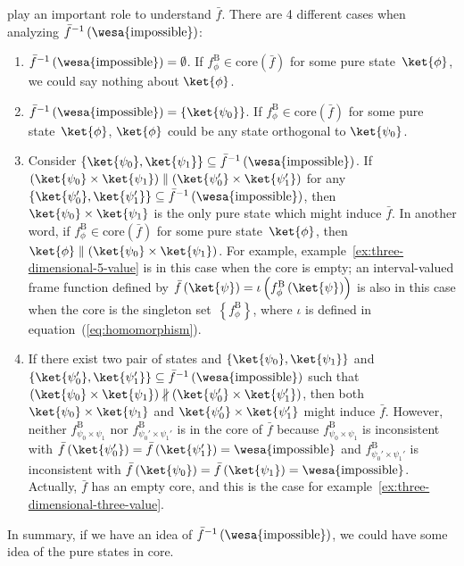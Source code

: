 \documentclass[12pt]{iopart}
\theoremstyle{plain}
\theoremstyle{definition}
\theoremstyle{remark}
\newcommand{\imposs}{{\mbox{\wesa{impossible}}}}
\begin{document}
play an important role to understand $\bar{f}$. There are 4 different
cases when analyzing $\bar{f}^{-1}\left(\imposs\right)$:
\begin{enumerate}
\item $\bar{f}^{-1}\left(\imposs\right)=\emptyset$. If $f_{\phi}^{\mathrm{B}}\in\mathrm{core}\left(\bar{f}\right)$
for some pure state~$\ket{\phi}$, we could say nothing about $\ket{\phi}$.
\item $\bar{f}^{-1}\left(\imposs\right)=\left\{ \ket{\psi_{0}}\right\} $.
If $f_{\phi}^{\mathrm{B}}\in\mathrm{core}\left(\bar{f}\right)$ for some pure
state~$\ket{\phi}$, $\ket{\phi}$ could be any state orthogonal
to $\ket{\psi_{0}}$.
\item Consider $\left\{ \ket{\psi_{0}},\ket{\psi_{1}}\right\} \subseteq\bar{f}^{-1}\left(\imposs\right)$.
If $\left(\ket{\psi_{0}}\times\ket{\psi_{1}}\right)\parallel\left(\ket{\psi_{0}'}\times\ket{\psi_{1}'}\right)$
for any $\left\{ \ket{\psi_{0}'},\ket{\psi_{1}'}\right\} \subseteq\bar{f}^{-1}\left(\imposs\right)$,
then $\ket{\psi_{0}}\times\ket{\psi_{1}}$ is the only pure state
which might induce $\bar{f}$. In another word, if $f_{\phi}^{\mathrm{B}}\in\mathrm{core}\left(\bar{f}\right)$
for some pure state~$\ket{\phi}$, then $\ket{\phi}\parallel\left(\ket{\psi_{0}}\times\ket{\psi_{1}}\right)$.
For example, example~\ref{ex:three-dimensional-5-value} is in this
case when the core is empty; an interval-valued frame function defined
by $\bar{f}\left(\ket{\psi}\right)=\iota\left(f_{\phi}^{\mathrm{B}}\left(\ket{\psi}\right)\right)$
is also in this case when the core is the singleton set~$\left\{ f_{\phi}^{\mathrm{B}}\right\} $,
where $\iota$ is defined in equation~(\ref{eq:homomorphism}). 
\item If there exist two pair of states and $\left\{ \ket{\psi_{0}},\ket{\psi_{1}}\right\} $
and $\left\{ \ket{\psi_{0}'},\ket{\psi_{1}'}\right\} \subseteq\bar{f}^{-1}\left(\imposs\right)$
such that $\left(\ket{\psi_{0}}\times\ket{\psi_{1}}\right)\nparallel\left(\ket{\psi_{0}'}\times\ket{\psi_{1}'}\right)$,
then both $\ket{\psi_{0}}\times\ket{\psi_{1}}$ and $\ket{\psi_{0}'}\times\ket{\psi_{1}'}$
might induce $\bar{f}$. However, neither $f_{\psi_{0}\times\psi_{1}}^{\mathrm{B}}$
nor $f_{\psi_{0}'\times\psi_{1}'}^{\mathrm{B}}$ is in the core of $\bar{f}$
because $f_{\psi_{0}\times\psi_{1}}^{\mathrm{B}}$ is inconsistent with $\bar{f}\left(\ket{\psi_{0}'}\right)=\bar{f}\left(\ket{\psi_{1}'}\right)=\imposs$
and $f_{\psi_{0}'\times\psi_{1}'}^{\mathrm{B}}$ is inconsistent with $\bar{f}\left(\ket{\psi_{0}}\right)=\bar{f}\left(\ket{\psi_{1}}\right)=\imposs$.
Actually, $\bar{f}$ has an empty core, and this is the case for example~\ref{ex:three-dimensional-three-value}.
\end{enumerate}
In summary, if we have an idea of $\bar{f}^{-1}\left(\imposs\right)$,
we could have some idea of the pure states in core.
\end{document}
